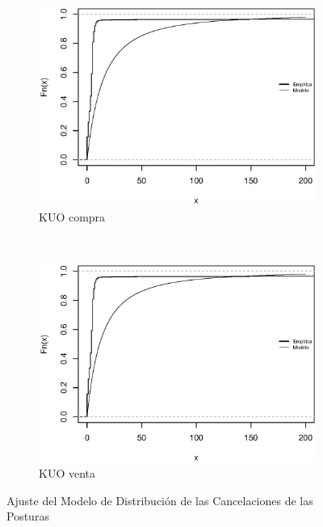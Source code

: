 \documentclass[11pt]{article}
\numberwithin{equation}{section} %
\begin{document}
\begin{figure}[htbp]
\begin{subfigure}[b]{0.5\textwidth}
\centering
\includegraphics[width=\textwidth, trim=0 0.5cm 0 1cm]{kuocanccompra.eps}
\caption{KUO compra}
\label{fig:kuocanccompra}
\end{subfigure}%
~ %
\begin{subfigure}[b]{0.5\textwidth}
\centering
\includegraphics[width=\textwidth, trim=0 0.5cm 0 1cm]{kuocancventa.eps}
\caption{KUO venta}
\label{fig:kuocancventa}
\end{subfigure}

\caption{Ajuste del Modelo de Distribución de las Cancelaciones de las Posturas}
\label{fig:canc}
\end{figure}
\end{document}
